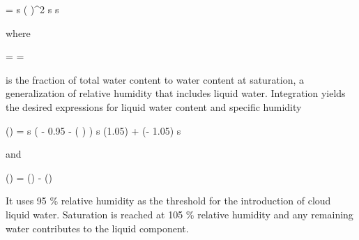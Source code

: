     \startformula
        \DERIV{\QLIQ}{\RHL} = \QSAT \startcases
             \MC s  \NR
            \NC \cos \left(   \right)^2
                 \le s  \NR
              \lt s \NR
        \stopcases
    \stopformula

    where

    \startformula
        \RHL = \frac{\QTOT}{\QSAT} = \frac{\QVAP + \QLIQ}{\QSAT}
    \stopformula

    is the fraction of total water content to water content at saturation,
    a generalization of relative humidity that includes liquid water.
    Integration yields the desired expressions for liquid water content and
    specific humidity

    \placeformula
    \startformula
    \startalign[align={center,right}]
        \NC
        \QLIQ(\RHL) = \startcases[align={left,left,right}]
             \MC s  \NR
            \NC {} \left( \RHL - 0.95 - 
                \cos \left(  \right) \right)
                 \le s  \NR
            \NC \QLIQ(1.05) + \QSAT (\RHL - 1.05)  \lt s \NR
        \stopcases \NC \NR[eq:qliq]
    \stopalign
    \stopformula

    and

    \placeformula[eq:qvap]
    \startformula
        \QVAP(\RHL) = \QTOT(\RHL) - \QLIQ(\RHL) \EQSTOP
    \stopformula

    It uses 95 \% relative humidity as the threshold for the introduction of
    cloud liquid water. Saturation is reached at 105 \% relative humidity and
    any remaining water contributes to the liquid component.

